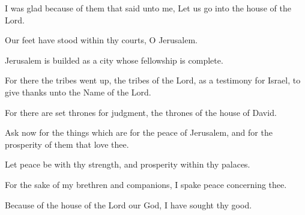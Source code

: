 I was glad because of them that said unto me, Let us go into the house of the Lord.

Our feet have stood within thy courts, O Jerusalem.

Jerusalem is builded as a city whose fellowship is complete.

For there the tribes went up, the tribes of the Lord, as a testimony for Israel, to give thanks unto the Name of the Lord.

For there are set thrones for judgment, the thrones of the house of David.

Ask now for the things which are for the peace of Jerusalem, and for the prosperity of them that love thee.

Let peace be with thy strength, and prosperity within thy palaces.

For the sake of my brethren and companions, I spake peace concerning thee.

Because of the house of the Lord our God, I have sought thy good.
